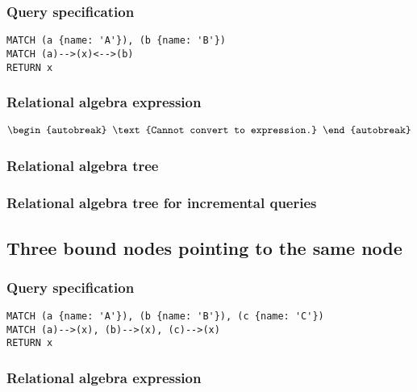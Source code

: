 \subsubsection*{Query specification}

\begin{lstlisting}
MATCH (a {name: 'A'}), (b {name: 'B'})
MATCH (a)-->(x)<-->(b)
RETURN x
\end{lstlisting}

\subsubsection*{Relational algebra expression}

\begin{align*}
\begin{autobreak}
\text{Cannot convert to expression.}
\end{autobreak}
\end{align*}

\subsubsection*{Relational algebra tree}


\subsubsection*{Relational algebra tree for incremental queries}


\subsection{Three bound nodes pointing to the same node}

\subsubsection*{Query specification}

\begin{lstlisting}
MATCH (a {name: 'A'}), (b {name: 'B'}), (c {name: 'C'})
MATCH (a)-->(x), (b)-->(x), (c)-->(x)
RETURN x
\end{lstlisting}

\subsubsection*{Relational algebra expression}


